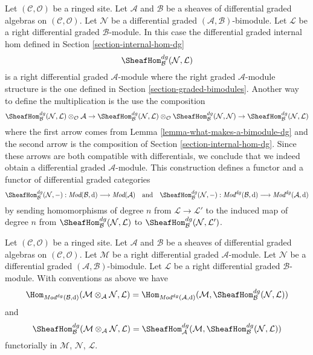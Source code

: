 \medskip\noindent
Let $(\mathcal{C}, \mathcal{O})$ be a ringed site. Let $\mathcal{A}$
and $\mathcal{B}$ be a sheaves of differential graded algebras on
$(\mathcal{C}, \mathcal{O})$. Let $\mathcal{N}$ be a
differential graded $(\mathcal{A}, \mathcal{B})$-bimodule. Let 
$\mathcal{L}$ be a right differential graded $\mathcal{B}$-module.
In this case the differential graded internal hom
defined in Section \ref{section-internal-hom-dg}
$$
\SheafHom_\mathcal{B}^{dg}(\mathcal{N}, \mathcal{L})
$$
is a right differential graded $\mathcal{A}$-module where the
right graded $\mathcal{A}$-module structure is the one defined
in Section \ref{section-graded-bimodules}. Another way to define
the multiplication is the use the composition
$$
\SheafHom_\mathcal{B}^{dg}(\mathcal{N}, \mathcal{L})
\otimes_\mathcal{O} \mathcal{A}
\to
\SheafHom_\mathcal{B}^{dg}(\mathcal{N}, \mathcal{L})
\otimes_\mathcal{O} \SheafHom_\mathcal{B}^{dg}(\mathcal{N}, \mathcal{N})
\to
\SheafHom_\mathcal{B}^{dg}(\mathcal{N}, \mathcal{L})
$$
where the first arrow comes from Lemma \ref{lemma-what-makes-a-bimodule-dg}
and the second arrow is the composition of
Section \ref{section-internal-hom-dg}. Since these arrows are
both compatible with differentials, we conclude that we indeed
obtain a differential graded $\mathcal{A}$-module.
This construction
defines a functor and a functor of differential graded categories
$$
\SheafHom_\mathcal{B}^{dg}(\mathcal{N}, -) :
\textit{Mod}(\mathcal{B}, \text{d})
\longrightarrow
\textit{Mod}(\mathcal{A})
\quad\text{and}\quad
\SheafHom_\mathcal{B}^{dg}(\mathcal{N}, -) :
\textit{Mod}^{dg}(\mathcal{B}, \text{d})
\longrightarrow
\textit{Mod}^{dg}(\mathcal{A}, \text{d})
$$
by sending homomorphisms of degree $n$ from $\mathcal{L} \to \mathcal{L}'$
to the induced map of degree $n$ from
$\SheafHom_\mathcal{B}^{dg}(\mathcal{N}, \mathcal{L})$ to
$\SheafHom_\mathcal{B}^{dg}(\mathcal{N}, \mathcal{L}')$.

\begin{lemma}
\label{lemma-tensor-hom-adjunction-dg}
Let $(\mathcal{C}, \mathcal{O})$ be a ringed site. Let $\mathcal{A}$
and $\mathcal{B}$ be a sheaves of differential graded algebras on
$(\mathcal{C}, \mathcal{O})$. Let $\mathcal{M}$ be a right
differential graded $\mathcal{A}$-module. Let $\mathcal{N}$ be a
differential graded $(\mathcal{A}, \mathcal{B})$-bimodule. Let $\mathcal{L}$
be a right differential graded $\mathcal{B}$-module. With conventions as above
we have
$$
\Hom_{\textit{Mod}^{dg}(\mathcal{B}, \text{d})}(
\mathcal{M} \otimes_\mathcal{A} \mathcal{N}, \mathcal{L}) =
\Hom_{\textit{Mod}^{dg}(\mathcal{A}, \text{d})}(
\mathcal{M}, \SheafHom_\mathcal{B}^{dg}(\mathcal{N}, \mathcal{L}))
$$
and
$$
\SheafHom_\mathcal{B}^{dg}(
\mathcal{M} \otimes_\mathcal{A} \mathcal{N}, \mathcal{L}) =
\SheafHom_\mathcal{A}^{dg}(
\mathcal{M}, \SheafHom_\mathcal{B}^{dg}(\mathcal{N}, \mathcal{L}))
$$
functorially in $\mathcal{M}$, $\mathcal{N}$, $\mathcal{L}$.
\end{lemma}

